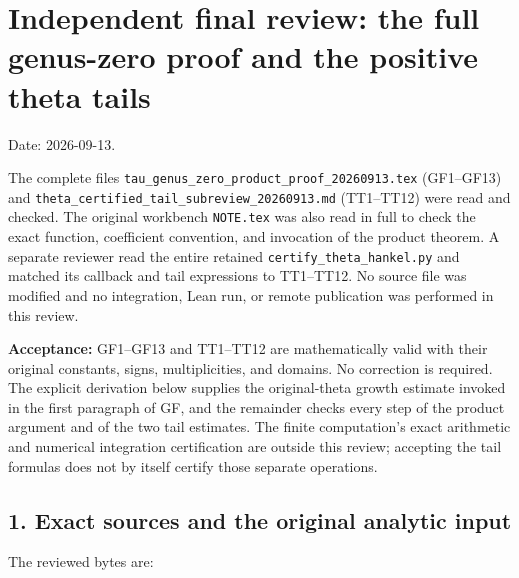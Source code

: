 \section{Independent final review: the full genus-zero proof and the positive theta tails}\label{independent-final-review-the-full-genus-zero-proof-and-the-positive-theta-tails}

Date: 2026-09-13.

The complete files \nolinkurl{tau_genus_zero_product_proof_20260913.tex} (GF1--GF13) and \nolinkurl{theta_certified_tail_subreview_20260913.md} (TT1--TT12) were read and checked. The original workbench \nolinkurl{NOTE.tex} was also read in full to check the exact function, coefficient convention, and invocation of the product theorem. A separate reviewer read the entire retained \nolinkurl{certify_theta_hankel.py} and matched its callback and tail expressions to TT1--TT12. No source file was modified and no integration, Lean run, or remote publication was performed in this review.

\textbf{Acceptance:} GF1--GF13 and TT1--TT12 are mathematically valid with their original constants, signs, multiplicities, and domains. No correction is required. The explicit derivation below supplies the original-theta growth estimate invoked in the first paragraph of GF, and the remainder checks every step of the product argument and of the two tail estimates. The finite computation's exact arithmetic and numerical integration certification are outside this review; accepting the tail formulas does not by itself certify those separate operations.

\subsection{1. Exact sources and the original analytic input}\label{exact-sources-and-the-original-analytic-input}

The reviewed bytes are:

